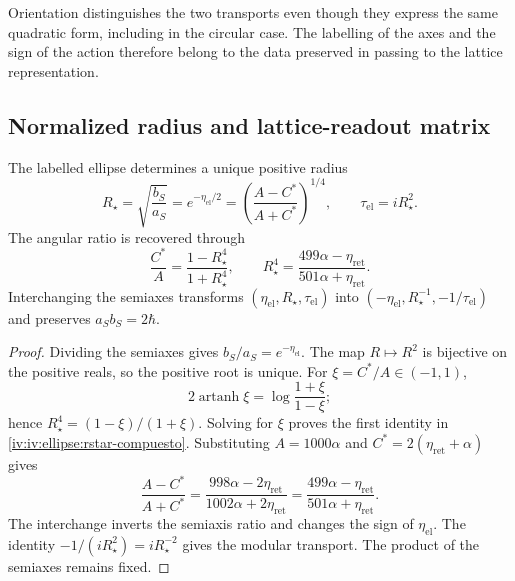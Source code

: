 Orientation distinguishes the two transports even though they express
the same quadratic form, including in the circular case.
The labelling of the axes and the sign of the action therefore belong
to the data preserved in passing to the
lattice representation.

\subsection{Normalized radius and lattice-readout matrix}
\label{iv:iv:ellipse:radio}

\begin{proposition}
\label{iv:iv:ellipse:radio-prop}
The labelled ellipse determines a unique positive radius
\begin{equation}
 R_\star=\sqrt{\frac{b_S}{a_S}}
 =e^{-\eta_{\mathrm{el}}/2}
 =\left(\frac{A-C^*}{A+C^*}\right)^{1/4},
 \qquad \tau_{\mathrm{el}}=iR_\star^2.
 \label{iv:iv:ellipse:rstar}
\end{equation}
The angular ratio is recovered through
\begin{equation}
 \frac{C^*}{A}=\frac{1-R_\star^4}{1+R_\star^4},
 \qquad
 R_\star^4=
 \frac{499\alpha-\eta_{\mathrm{ret}}}
      {501\alpha+\eta_{\mathrm{ret}}}.
 \label{iv:iv:ellipse:rstar-compuesto}
\end{equation}
Interchanging the semiaxes transforms
\((\eta_{\mathrm{el}},R_\star,\tau_{\mathrm{el}})\) into
\((-\eta_{\mathrm{el}},R_\star^{-1},-1/\tau_{\mathrm{el}})\)
and preserves \(a_Sb_S=2\hbar\).
\end{proposition}
\begin{proof}
Dividing the semiaxes gives \(b_S/a_S=e^{-\eta_{\mathrm{el}}}\).
The map \(R\mapsto R^2\) is bijective on the positive
reals, so the positive root is unique.
For \(\xi=C^*/A\in(-1,1)\),
\[
 2\operatorname{artanh}\xi
 =\log\frac{1+\xi}{1-\xi};
\]
hence \(R_\star^4=(1-\xi)/(1+\xi)\).
Solving for \(\xi\) proves the first identity in
\eqref{iv:iv:ellipse:rstar-compuesto}. Substituting
\(A=1000\alpha\) and
\(C^*=2(\eta_{\mathrm{ret}}+\alpha)\) gives
\[
 \frac{A-C^*}{A+C^*}
 =\frac{998\alpha-2\eta_{\mathrm{ret}}}
        {1002\alpha+2\eta_{\mathrm{ret}}}
 =\frac{499\alpha-\eta_{\mathrm{ret}}}
        {501\alpha+\eta_{\mathrm{ret}}}.
\]
The interchange inverts the semiaxis ratio and changes the
sign of \(\eta_{\mathrm{el}}\). The identity
\(-1/(iR_\star^2)=iR_\star^{-2}\) gives the modular
transport. The product of the semiaxes remains fixed.
\end{proof}

